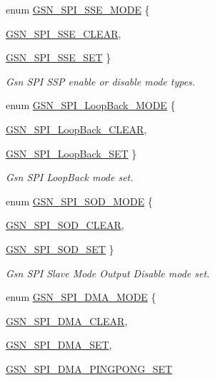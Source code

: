 \begin{DoxyCompactItemize}
enum \hyperlink{a00655_ga03895c293b4a0520478212a5a031020d}{GSN\_\-SPI\_\-SSE\_\-MODE} \{ \par
\hyperlink{a00655_gga03895c293b4a0520478212a5a031020da7589e64256fe936761aa1d21a631f5cb}{GSN\_\-SPI\_\-SSE\_\-CLEAR}, 
\par
\hyperlink{a00655_gga03895c293b4a0520478212a5a031020da5985d59b31c7810deee4cb66a196ca20}{GSN\_\-SPI\_\-SSE\_\-SET}
 \}
\begin{DoxyCompactList}\small\item\em Gsn SPI SSP enable or disable mode types. \end{DoxyCompactList}\item 
enum \hyperlink{a00655_ga64d5d284cb01ecc3c94f83cd0b22fea0}{GSN\_\-SPI\_\-LoopBack\_\-MODE} \{ \par
\hyperlink{a00655_gga64d5d284cb01ecc3c94f83cd0b22fea0ab2884bcbedf7d7d0637f3298d9a33eb2}{GSN\_\-SPI\_\-LoopBack\_\-CLEAR}, 
\par
\hyperlink{a00655_gga64d5d284cb01ecc3c94f83cd0b22fea0a53a6810aebddcfe97652d9a46a40cfb5}{GSN\_\-SPI\_\-LoopBack\_\-SET}
 \}
\begin{DoxyCompactList}\small\item\em Gsn SPI LoopBack mode set. \end{DoxyCompactList}\item 
enum \hyperlink{a00655_gad8f5cb14958ae6607aad0159bf3dc5b4}{GSN\_\-SPI\_\-SOD\_\-MODE} \{ \par
\hyperlink{a00655_ggad8f5cb14958ae6607aad0159bf3dc5b4a673eb4658e63e9f7e81ac858cb1ca076}{GSN\_\-SPI\_\-SOD\_\-CLEAR}, 
\par
\hyperlink{a00655_ggad8f5cb14958ae6607aad0159bf3dc5b4a08dc6552a27eca2fd23133ced3938f1a}{GSN\_\-SPI\_\-SOD\_\-SET}
 \}
\begin{DoxyCompactList}\small\item\em Gsn SPI Slave Mode Output Disable mode set. \end{DoxyCompactList}\item 
enum \hyperlink{a00655_ga5877a1a4dee99757a5560a974edd42ca}{GSN\_\-SPI\_\-DMA\_\-MODE} \{ \par
\hyperlink{a00655_gga5877a1a4dee99757a5560a974edd42caa57592c04bb258333fb01f83deb98b703}{GSN\_\-SPI\_\-DMA\_\-CLEAR}, 
\par
\hyperlink{a00655_gga5877a1a4dee99757a5560a974edd42caa92f7215f44c8faf04067cc9d500d1d53}{GSN\_\-SPI\_\-DMA\_\-SET}, 
\par
\hyperlink{a00655_gga5877a1a4dee99757a5560a974edd42caa83c30d5653f56066a6b49c07dc5f4222}{GSN\_\-SPI\_\-DMA\_\-PINGPONG\_\-SET}

\end{DoxyCompactItemize}
